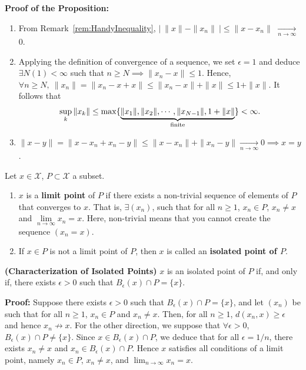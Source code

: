\textbf{Proof of the Proposition:}
    \begin{enumerate}
        \item From Remark~\ref{rem:HandyInequality}, $|~ \| x \| - \| x_n\| ~| \leq \| x-x_n\|$ $\xrightarrow[n \to \infty]{}$ 0.
        \item Applying the definition of convergence of a sequence, we set $\epsilon = 1$ and deduce  $\exists N(1) <\infty$ such that $n \geq N \implies  \|x_n-x\| \leq 1$. Hence,  $\forall n \geq N,\ \| x_n\| =\|x_n-x+x\| \leq \| x_n - x\| + \| x \| \leq 1+\| x \|.$ It follows that
            \begin{equation*}
                \sup\limits_{k}\| x_k\| \leq \operatorname{max}\{\underbrace{\| x_1\|, \| x_2\|, \dotsb , \| x_{N-1}\|, 1+ \| x \|}_\textnormal{finite}\}<\infty.
            \end{equation*}
        \item $\| x-y\| = \| x-x_n +x_n-y\| \leq \| x-x_n\| + \| x_n -y\| \xrightarrow[n \to \infty]{} 0  \implies x=y$.
    \end{enumerate}
    \Qed

\begin{definition} Let $x\in \mathcal{X}$, $P \subset \mathcal{X}$ a subset. 
\begin{enumerate}
    \item $x$ is a \textbf{ limit point} of $P$ if there exists a non-trivial sequence of elements of $P$ that converges to $x$. That is, $\exists (x_n)$, such that for all $n\ge 1$,  $x_n \in P$, $x_n \neq x$ and $\lim\limits_{n \to \infty} x_n = x.$ Here, non-trivial means that you cannot create the sequence $(x_n=x)$.
    \item If $x\in P$ is not a limit point of $P$, then $x$ is called an \textbf{isolated point of $P$}.
\end{enumerate}
\end{definition} 

\begin{prop} \textbf{(Characterization of Isolated Points)} $x$ is an isolated point of $P$ if, and only if, there exists $\epsilon>0$ such that $B_\epsilon(x) \cap P = \{ x\}$.
\end{prop}

\textbf{Proof:} Suppose there exists $\epsilon>0$ such that $B_\epsilon(x) \cap P = \{ x\}$, and let $(x_n)$ be such that for all $n\ge 1$,  $x_n \in P$ and $x_n \neq x$. Then, for all $n\ge 1$, $d(x_n, x)\ge \epsilon$ and hence $x_n \not \to x$. For the other direction, we suppose that $\forall \epsilon>0$, $B_\epsilon(x) \cap P \neq \{ x\}$. Since $x\in B_\epsilon(x) \cap P$, we deduce that for all $\epsilon=1/n$, there exists $x_n\neq x$ and $x_n\in B_\epsilon(x) \cap P$. Hence $x$ satisfies all conditions of a limit point, namely $x_n\in P$, $x_n \neq x$, and $\lim_{n \to \infty} x_n = x$.
\Qed

